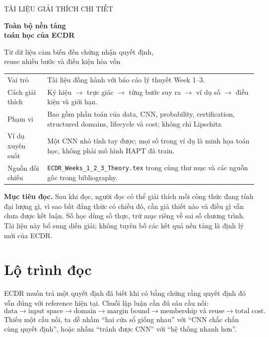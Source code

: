 \documentclass[11pt,a4paper]{article}
\newcommand{\code}[1]{{\small\ttfamily\nolinkurl{#1}}}
\theoremstyle{definition}
\begin{document}
\hypersetup{pageanchor=false}
\begin{titlepage}
\vspace*{1.1cm}
{\Large\color{teal} TÀI LIỆU GIẢI THÍCH CHI TIẾT\par}
\vspace{0.6cm}
{\huge\bfseries\color{ink} Toàn bộ nền tảng\\toán học của ECDR\par}
\vspace{0.7cm}
{\Large Từ dữ liệu cảm biến đến chứng nhận quyết định,\\
reuse nhiều bước và điều kiện hòa vốn\par}
\vspace{1cm}
\begin{tabularx}{\linewidth}{@{}p{3cm}Y@{}}\toprule
Vai trò & Tài liệu đồng hành với báo cáo lý thuyết Week 1--3.\\
Cách giải thích & Ký hiệu $\to$ trực giác $\to$ từng bước suy ra $\to$
ví dụ số $\to$ điều kiện và giới hạn.\\
Phạm vi & Bao gồm phần toán của data, CNN, probability, certification,
structured domains, lifecycle và cost; không chỉ Lipschitz.\\
Ví dụ xuyên suốt & Một CNN nhỏ tính tay được; mọi số trong ví dụ là minh
họa toán học, không phải mô hình HAPT đã train.\\
Nguồn đối chiếu & \code{ECDR_Weeks_1_2_3_Theory.tex} trong cùng thư mục và
các nguồn gốc trong bibliography.\\\bottomrule
\end{tabularx}
\vfill
\textbf{Mục tiêu đọc.} Sau khi đọc, người đọc có thể giải thích mỗi công
thức đang tính đại lượng gì, vì sao bất đẳng thức có chiều đó, cần giả thiết
nào và điều gì vẫn chưa được kết luận. Số học dùng số thực, trừ mục riêng
về sai số chương trình. Tài liệu này bổ sung diễn giải; không tuyên bố các
kết quả nền tảng là định lý mới của ECDR.
\end{titlepage}
\hypersetup{pageanchor=true}

\section*{Lộ trình đọc}
ECDR muốn trả một quyết định đã biết khi có bằng chứng rằng quyết định đó
vẫn đúng với reference hiện tại. Chuỗi lập luận cần đủ sáu cầu nối:
\begin{equation*}
\text{data}\to\text{input space}\to\text{domain}\to\text{margin bound}
\to\text{membership và reuse}\to\text{total cost}.
\end{equation*}
Thiếu một cầu nối, ta dễ nhầm ``hai cửa sổ giống nhau'' với ``CNN chắc chắn
cùng quyết định'', hoặc nhầm ``tránh được CNN'' với ``hệ thống nhanh hơn''.
\end{document}
